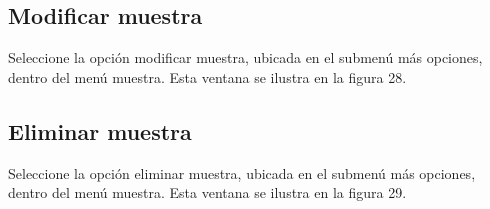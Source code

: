 \newpage

	\subsection{Modificar muestra}
	
	Seleccione la opci\'{o}n modificar muestra, ubicada en el submen\'{u} m\'{a}s opciones, dentro del men\'{u} muestra. Esta ventana se ilustra en la figura 28.
	
	\subsection{Eliminar muestra}
	
	Seleccione la opci\'{o}n eliminar muestra, ubicada en el submen\'{u} m\'{a}s opciones, dentro del men\'{u} muestra. Esta ventana se ilustra en la figura 29.
	
